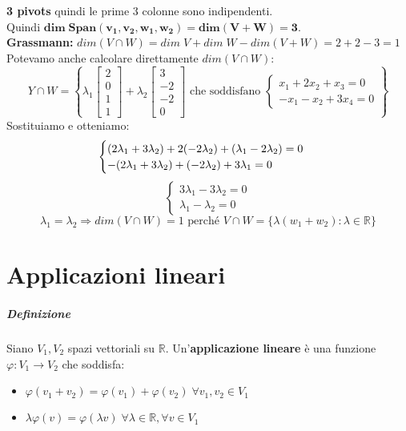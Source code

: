 \documentclass[a4paper, 12pt]{report}
\begin{document}
            \textbf{3 pivots} quindi le prime 3 colonne sono indipendenti.\\
            Quindi $\boldsymbol{dim \; Span(v_1,v_2,w_1,w_2)=dim(V+W)=3}$.\\
            \textbf{Grassmann:} $dim (V \cap W) = dim \; V + dim \; W - dim(V+W)=2+2-3=1$\\[4px]
            Potevamo anche calcolare direttamente $dim(V\cap W)$:
            $$
            Y\cap W = \left \{ \lambda_1
            \begin{bmatrix}
                2\\
                0\\
                1\\
                1
            \end{bmatrix}    
            +\lambda_2
            \begin{bmatrix}
                3\\
                -2\\
                -2\\
                0
            \end{bmatrix}
            \text{ che soddisfano }
            \begin{cases}
                x_1+2x_2+x_3=0\\
                -x_1-x_2+3x_4=0
            \end{cases}
            \right \}
            $$
            Sostituiamo e otteniamo:
            $$
            \begin{cases}
                (2\lambda_1+3\lambda_2)+2(-2\lambda_2)+(\lambda_1-2\lambda_2)=0\\
                -(2\lambda_1+3\lambda_2)+(-2\lambda_2)+3\lambda_1=0
            \end{cases}\\
            $$
            $$
            \begin{cases}
                3\lambda_1-3\lambda_2=0\\
                \lambda_1-\lambda_2=0
            \end{cases}
            $$
            $$
            \lambda_1=\lambda_2 \Rightarrow dim (V \cap W)=1 \text{ perché } V\cap W=\{\lambda(w_1+w_2):\lambda \in \mathbb{R}\}
            $$
    \chapter{Applicazioni lineari}
        \paragraph{Definizione}Siano $V_1,V_2$ spazi vettoriali su $\mathbb{R}$. Un'\textbf{applicazione lineare} è una funzione $\varphi: V_1 \rightarrow V_2$ che soddisfa:
            \begin{itemize}
                \item $\varphi (v_1+v_2)=\varphi(v_1)+\varphi(v_2) \; \forall v_1,v_2 \in V_1$
                \item $\lambda \varphi(v)=\varphi(\lambda v) \; \forall \lambda \in \mathbb{R}, \forall v \in V_1$
            \end{itemize}
\end{document}
